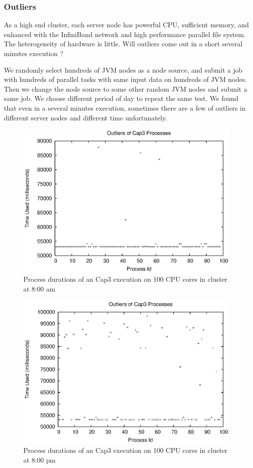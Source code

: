 \subsubsection{Outliers}
As a high end cluster, each server node has powerful CPU, sufficient memory, and enhanced with the InfiniBand network and high performance parallel file system. The heterogeneity of hardware is little. Will outliers come out in a short several minutes execution ?

We randomly select hundreds of JVM nodes as a node source, and submit a job with hundreds of parallel tasks with same input data on hundreds of JVM nodes. Then we change the node source to some other random JVM nodes and submit a same job. We choose different period of day to repeat the same test. We found that even in a several minutes execution, sometimes there are a few of outliers in different server nodes and different time unfortunately.

\begin{figure}
\centering
\includegraphics[width=0.9\columnwidth]{figures/outliers.eps}
\caption{Process durations of an Cap3 execution on 100 CPU cores in cluster at 8:00 am}
\label{figure:outlier}
\end{figure}

\begin{figure}
\centering
\includegraphics[width=0.9\columnwidth]{figures/yaoutliers.eps}
\caption{Process durations of an Cap3 execution on 100 CPU cores in cluster at 8:00 pm}
\label{figure:yaoutlier}
\end{figure}

